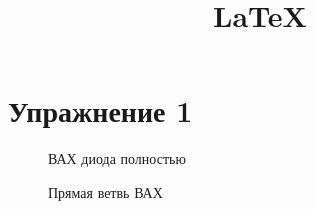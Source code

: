 \documentclass[12pt]{article}
\title{\LaTeX}
\date{}
\author{}
\begin{document}
	\section*{Упражнение 1}
	
	\indent
	
	\begin{figure}[H]
		\caption{ВАХ диода полностью}
		\label{fig:image}
	\end{figure}
	
	\begin{figure}[H]
		\caption{Прямая ветвь ВАХ}
		\label{fig:image2}
	\end{figure}
\end{document}

